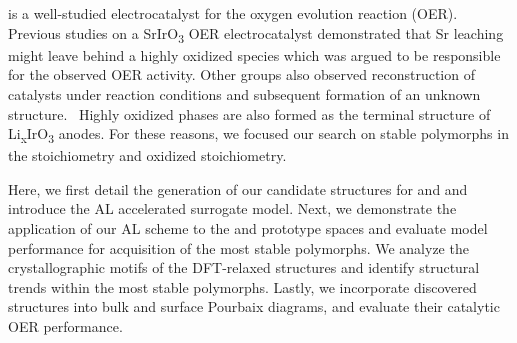 is a well-studied electrocatalyst for the oxygen evolution reaction (OER).
\cite{Seitz2016,Lee2012a,McCrory2015,Trotochaud2012,Danilovic2014,Carmo2013,Miles1978,Beni1979}
%
Previous studies on a SrIrO\textsubscript{3} OER electrocatalyst demonstrated that Sr leaching might leave behind a highly oxidized  species which was argued to be responsible for the observed OER activity.
\cite{Seitz2016}
%
Other groups also observed reconstruction of \IrOx catalysts under reaction conditions and subsequent formation of an unknown structure.~\cite{Pearce2017}
%
Highly oxidized \IrOthree phases are also formed as the terminal structure of Li\textsubscript{x}IrO\textsubscript{3} anodes.\cite{Pearce2017}
%
For these reasons, we focused our search on stable polymorphs in the \IrOtwo stoichiometry and  oxidized \IrOthree stoichiometry.
%


%
%
Here, we first detail the generation of our candidate structures for \IrOtwo and \IrOthree and introduce the AL accelerated surrogate model.
%
Next, we demonstrate the application of our AL scheme to the \IrOtwo and \IrOthree prototype spaces and evaluate model performance for acquisition of the most stable polymorphs.
%
We analyze the crystallographic motifs of the DFT-relaxed structures and identify structural trends within the most stable polymorphs.
%
Lastly, we incorporate discovered structures into bulk and surface Pourbaix diagrams, and evaluate their catalytic OER performance.%
%
